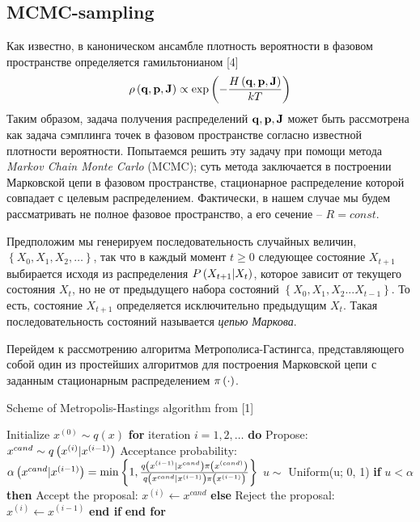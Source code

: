 \subsection{MCMC-sampling}

Как известно, в каноническом ансамбле плотность вероятности в фазовом пространстве определяется гамильтонианом [4]
\begin{gather}
	\rho \left( \mathbf{q}, \mathbf{p}, \mathbf{J} \right) \propto \exp \left( - \frac{H \left( \mathbf{q}, \mathbf{p}, \mathbf{J} \right)}{k T} \right)  \notag
\end{gather}
Таким образом, задача получения распределений $\mathbf{q}, \mathbf{p}, \mathbf{J}$ может быть рассмотрена как задача сэмплинга точек в фазовом пространстве согласно известной плотности вероятности. Попытаемся решить эту задачу при помощи метода \textit{Markov Chain Monte Carlo} (MCMC); суть метода заключается в построении Марковской цепи в фазовом пространстве, стационарное распределение которой совпадает с целевым распределением. Фактически, в нашем случае мы будем рассматривать не полное фазовое пространство, а его сечение -- $R = const$. \par
Предположим мы генерируем последовательность случайных величин, $\left\{ X_0, X_1, X_2, \dots \right\}$, так что в каждый момент $t \geq 0$ следующее состояние $X_{t + 1}$ выбирается исходя из распределения $P \left( X_{t+1} | X_t \right)$, которое зависит от текущего состояния $X_t$, но не от предыдущего набора состояний $\left\{ X_0, X_1, X_2 ... X_{t - 1} \right\}$. То есть, состояние $X_{t + 1}$ определяется исключительно предыдущим $X_t$. Такая последовательность состояний называется \textit{цепью Маркова}. \par
Перейдем к рассмотрению алгоритма Метрополиса-Гастингса, представляющего собой один из простейших алгоритмов для построения Марковской цепи с заданным стационарным распределением $\pi \left( \cdot \right)$.

\begin{algorithm}
\begin{algorithmic}[1]
		\caption{Scheme of Metropolis-Hastings algorithm from [1]}\label{metropolis}
\State Initialize $x^{(0)} \sim q(x)$
\State \textbf{for} iteration $i = 1, 2, \dots$ \textbf{do}
\State \quad Propose: $x^{cand} \sim q \left( x^{(i)} | x^{(i-1)} \right)$
\State \quad Acceptance probability:
\State \qquad $\alpha \left( x^{cand} | x^{(i-1)} \right) = \min \left\{ 1, \frac{q \left( x^{(i-1)} | x^{cand} \right) \pi \left( x^{(cand)} \right) }{ q \left( x^{cand} | x^{(i-1)} \right) \pi \left( x^{(i-1)} \right)} \right\}$
\State \quad $u \sim$ Uniform(u; 0, 1)
\State \quad \textbf{if} $u < \alpha$ \textbf{then}
\State \qquad Accept the proposal: $x^{(i)} \gets x^{cand}$
\State \quad \textbf{else}
\State \qquad Reject the proposal: $x^{(i)} \gets x^{(i-1)}$
\State \quad \textbf{end if}
\State \textbf{end for}
\end{algorithmic}
\end{algorithm}

